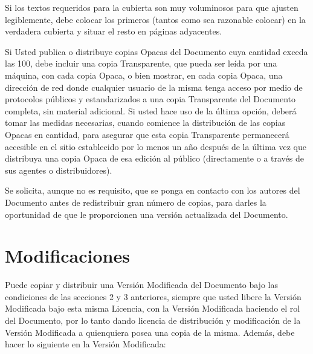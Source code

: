 Si los textos requeridos para la cubierta son muy voluminosos para que
ajusten legiblemente, debe colocar los primeros (tantos como sea
razonable colocar) en la verdadera cubierta y situar el resto en
páginas adyacentes.

Si Usted publica o distribuye copias Opacas del Documento cuya
cantidad exceda las 100, debe incluir una copia Transparente, que
pueda ser leída por una máquina, con cada copia Opaca, o bien mostrar,
en cada copia Opaca, una dirección de red donde cualquier usuario de
la misma tenga acceso por medio de protocolos públicos y
estandarizados a una copia Transparente del Documento completa, sin
material adicional. Si usted hace uso de la última opción, deberá
tomar las medidas necesarias, cuando comience la distribución de las
copias Opacas en cantidad, para asegurar que esta copia Transparente
permanecerá accesible en el sitio establecido por lo menos un año
después de la última vez que distribuya una copia Opaca de esa edición
al público (directamente o a través de sus agentes o distribuidores).

Se solicita, aunque no es requisito, que se ponga en contacto con los
autores del Documento antes de redistribuir gran número de copias,
para darles la oportunidad de que le proporcionen una versión
actualizada del Documento.


\section{Modificaciones}

Puede copiar y distribuir una Versión Modificada del Documento bajo
las condiciones de las secciones 2 y 3 anteriores, siempre que usted
libere la Versión Modificada bajo esta misma Licencia, con la Versión
Modificada haciendo el rol del Documento, por lo tanto dando licencia
de distribución y modificación de la Versión Modificada a quienquiera
posea una copia de la misma. Además, debe hacer lo siguiente en la
Versión Modificada:

